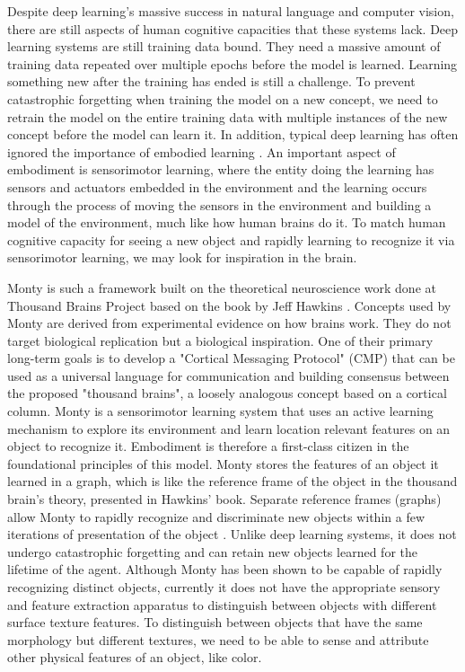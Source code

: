 \documentclass[runningheads]{llncs}
\begin{document}
Despite deep learning’s massive success in natural language and computer vision, there are still aspects of human cognitive capacities that these systems lack. Deep learning systems are still training data bound. They need a massive amount of training data repeated over multiple epochs before the model is learned. Learning something new after the training has ended is still a challenge. To prevent catastrophic forgetting \cite{vandeven2025109ContinualLearning,chen2018ContinualLearningCatastrophica} when training the model on a new concept, we need to retrain the model on the entire training data with multiple instances of the new concept before the model can learn it. In addition, typical deep learning has often ignored the importance of embodied learning \cite{paolo2024position,kugele2023embodied,kadambi2026EmbodimentMultimodalLarge,rolla2026EmbodimentChallengeArtificial}. An important aspect of embodiment is sensorimotor learning, where the entity doing the learning has sensors and actuators embedded in the environment and the learning occurs through the process of moving the sensors in the environment and building a model of the environment, much like how human brains do it. To match human cognitive capacity for seeing a new object and rapidly learning to recognize it via sensorimotor learning, we may look for inspiration in the brain. 
 
Monty \cite{2026ThousandbrainsprojectTbpmonty} is such a framework built on the theoretical neuroscience work \cite{thousandbrainsproject2024} done at Thousand Brains Project based on the book by Jeff Hawkins \cite{hawkins2021thousand}. Concepts used by Monty are derived from experimental evidence on how brains work. They do not target biological replication but a biological inspiration. One of their primary long-term goals is to develop a "Cortical Messaging Protocol" (CMP) that can be used as a universal language for communication and building consensus between the proposed "thousand brains", a loosely analogous concept based on a cortical column. Monty is a sensorimotor learning system that uses an active learning mechanism to explore its environment and learn location relevant features on an object to recognize it. Embodiment is therefore a first-class citizen in the foundational principles of this model. Monty stores the features of an object it learned in a graph, which is like the reference frame of the object in the thousand brain's theory, presented in Hawkins' book. Separate reference frames (graphs) allow Monty to rapidly recognize and discriminate new objects within a few iterations of presentation of the object \cite{leadholm2026thousand}. Unlike deep learning systems, it does not undergo catastrophic forgetting and can retain new objects learned for the lifetime of the agent. Although Monty has been shown to be capable of rapidly recognizing distinct objects, currently it does not have the appropriate sensory and feature extraction apparatus to distinguish between objects with different surface texture features. To distinguish between objects that have the same morphology but different textures, we need to be able to sense and attribute other physical features of an object, like color. 
 
\end{document}
